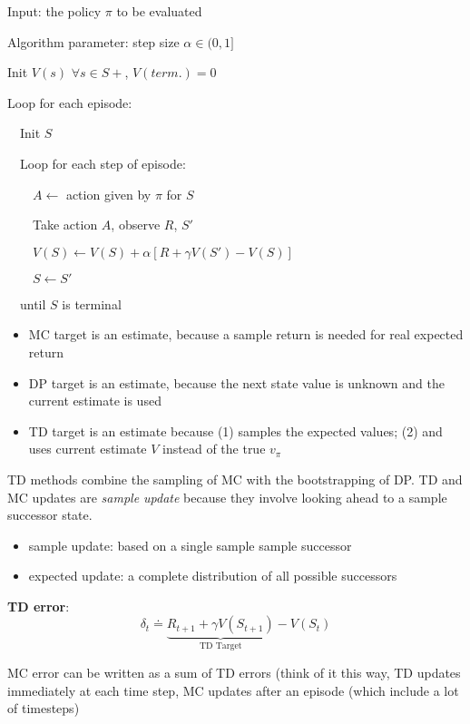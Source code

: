 \documentclass[sutton_barto_notes.tex]{subfiles}
\begin{document}
\begin{tcolorbox}[width=1.1\textwidth,title={Tabular TD(0) for estimating $v_\pi$}]
Input: the policy $\pi$ to be evaluated

Algorithm parameter: step size $\alpha \in (0, 1]$

Init $V(s)$ $\forall s \in S+$, $V(term.) = 0$

Loop for each episode:

$\quad$Init $S$

$\quad$Loop for each step of episode:

$\quad\quad A \leftarrow$ action given by $\pi$ for $S$

$\quad\quad$Take action $A$, observe $R$, $S'$

$\quad\quad V(S) \leftarrow V(S) + \alpha[R + \gamma V(S') - V(S)]$

$\quad\quad S \leftarrow S'$

$\quad$until $S$ is terminal
\end{tcolorbox}

\begin{itemize}
\item MC target is an estimate, because a sample return is needed for real expected return
\item DP target is an estimate, because the next state value is unknown and the current estimate is used
\item TD target is an estimate because (1) samples the expected values; (2) and uses current estimate $V$ instead of the true $v_\pi$
\end{itemize}

TD methods combine the sampling of MC with the bootstrapping of DP.
TD and MC updates are \textit{sample update} because they involve looking ahead to a sample successor state.

\begin{itemize}
\item sample update: based on a single sample sample successor
\item expected update: a complete distribution of all possible successors
\end{itemize}

\begin{definition}
\textbf{TD error}:
$$\delta_t \doteq \underbrace{R_{t+1} + \gamma V(S_{t+1})}_\text{TD Target} - V(S_t)$$
\end{definition}

MC error can be written as a sum of TD errors (think of it this way, TD updates immediately at each time step, MC updates after an episode (which include a lot of timesteps)
\end{document}
